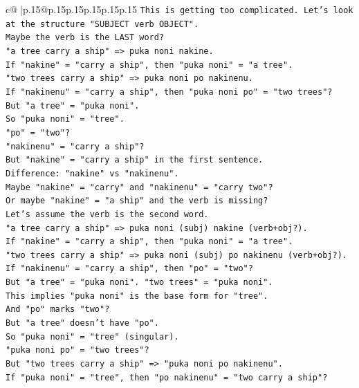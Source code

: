 \documentclass{article}
\begin{document}
{\begin{supertabular}{c@{$\;$}|p{.15\linewidth}@{}p{.15\linewidth}p{.15\linewidth}p{.15\linewidth}p{.15\linewidth}p{.15\linewidth}}
{{{\texttt{This is getting too complicated. Let's look at the structure "SUBJECT verb OBJECT".} \\
\texttt{Maybe the verb is the LAST word?} \\
\texttt{"a tree carry a ship" => puka noni nakine.} \\
\texttt{If "nakine" = "carry a ship", then "puka noni" = "a tree".} \\
\texttt{"two trees carry a ship" => puka noni po nakinenu.} \\
\texttt{If "nakinenu" = "carry a ship", then "puka noni po" = "two trees"?} \\
\texttt{But "a tree" = "puka noni".} \\
\texttt{So "puka noni" = "tree".} \\
\texttt{"po" = "two"?} \\
\texttt{"nakinenu" = "carry a ship"?} \\
\texttt{But "nakine" = "carry a ship" in the first sentence.} \\
\texttt{Difference: "nakine" vs "nakinenu".} \\
\texttt{Maybe "nakine" = "carry" and "nakinenu" = "carry two"?} \\
\texttt{Or maybe "nakine" = "a ship" and the verb is missing?} \\
\texttt{Let's assume the verb is the second word.} \\
\texttt{"a tree carry a ship" => puka noni (subj) nakine (verb+obj?).} \\
\texttt{If "nakine" = "carry a ship", then "puka noni" = "a tree".} \\
\texttt{"two trees carry a ship" => puka noni (subj) po nakinenu (verb+obj?).} \\
\texttt{If "nakinenu" = "carry a ship", then "po" = "two"?} \\
\texttt{But "a tree" = "puka noni". "two trees" = "puka noni".} \\
\texttt{This implies "puka noni" is the base form for "tree".} \\
\texttt{And "po" marks "two"?} \\
\texttt{But "a tree" doesn't have "po".} \\
\texttt{So "puka noni" = "tree" (singular).} \\
\texttt{"puka noni po" = "two trees"?} \\
\texttt{But "two trees carry a ship" => "puka noni po nakinenu".} \\
\texttt{If "puka noni" = "tree", then "po nakinenu" = "two carry a ship"?} \\
}}}
\end{supertabular}}
\end{document}
